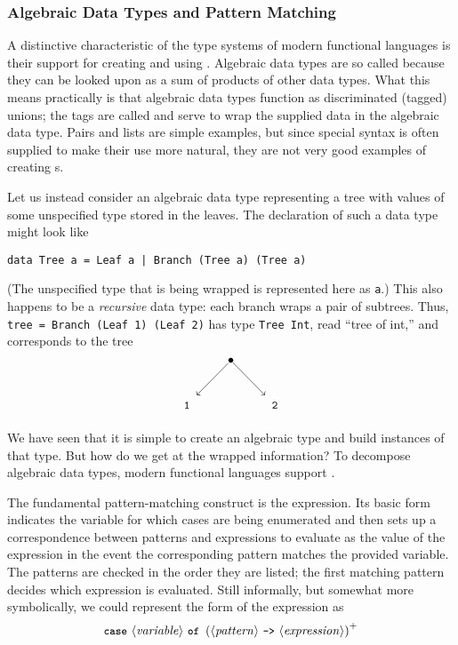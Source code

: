 \subsubsection{Algebraic Data Types and Pattern Matching}
A distinctive characteristic of the type systems of modern functional languages is their support for creating and using . Algebraic data types are so called because they can be looked upon as a sum of products of other data types. What this means practically is that algebraic data types function as discriminated (tagged) unions; the tags are called  and serve to wrap the supplied data in the algebraic data type. Pairs and lists are simple examples, but since special syntax is often supplied to make their use more natural, they are not very good examples of creating s.

Let us instead consider an algebraic data type representing a tree with values of some unspecified type stored in the leaves. The declaration of such a data type might look like \begin{lstlisting}
data Tree a = Leaf a | Branch (Tree a) (Tree a)
\end{lstlisting}
(The unspecified type that is being wrapped is represented here as \lstinline{a}.) This also happens to be a \emph{recursive} data type: each branch wraps a pair of subtrees. Thus, \lstinline{tree = Branch (Leaf 1) (Leaf 2)} has type \mbox{\lstinline{Tree Int}}, read ``tree of int,'' and corresponds to the tree
\[
\begin{xy}\SelectTips{eu}{10}
\xymatrix{%
&*{\bullet}\ar[dl] \ar[dr]\\
*++\txt{\code{1}}&&*++\txt{\code{2}}}
\end{xy}
\]

We have seen that it is simple to create an algebraic type and build instances of that type. But how do we get at the wrapped information? To decompose algebraic data types, modern functional languages support .

The fundamental pattern-matching construct is the  expression. Its basic form indicates the variable for which cases are being enumerated and then sets up a correspondence between patterns and expressions to evaluate as the value of the  expression in the event the corresponding pattern matches the provided variable. The patterns are checked in the order they are listed; the first matching pattern decides which expression is evaluated. Still informally, but somewhat more symbolically, we could represent the form of the  expression as
\[
\text{\text{\small\ttfamily case} } \langle\text{\textit{variable}}\rangle \text{ \text{\small\ttfamily of} } \left (\langle\text{\textit{pattern}}\rangle \text{ \text{\small\ttfamily ->} } \langle\text{\textit{expression}}\rangle \right)^{+}
\]

